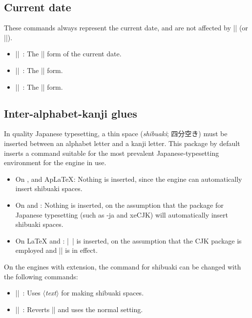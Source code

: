 \documentclass[a4paper]{article}
\newcommand{\Pkg}[1]{\textsf{#1}}
\newcommand{\Meta}[1]{$\langle$\textit{#1}$\rangle$}
\newcommand{\Means}{~:\quad}
\newcommand*{\Ja}[1]{{\fIpaex#1}}
\newcommand*{\+}{\hspace{0.25em minus 0.25em}}
\begin{document}
\subsection{Current date}

These commands always represent the current date,
and are not affected by |\warekisetdate| (or |\warekisettoday|).

\begin{itemize}
\item |\warekitoday|\Means
  The |\warekidate| form of the current date.
\item |\warekikanjitoday|\Means
  The |\warekikanjidate| form.
\item |\warekijkanjitoday|\Means
  The |\warekijkanjidate| form.
\end{itemize}

\subsection{Inter-alphabet-kanji glues}

In quality Japanese typesetting, a thin space
(\emph{shibuaki}; \Ja{四分空き}) must be inserted
between an alphabet letter and a kanji letter.
This package by default inserts a command
suitable for the most prevalent Japanese-typesetting environment
for the engine in use.

\begin{itemize}
\item On {\pLaTeX}, {\upLaTeX} and {Ap\LaTeX}:
  Nothing is inserted,
  since the engine can automatically insert shibuaki spaces.
\item On {\LuaLaTeX} and {\XeLaTeX}:
  Nothing is inserted,
  on the assumption that the package for Japanese typesetting
  (such as \Pkg{\LuaTeX-ja} and \Pkg{xeCJK})
  will automatically insert shibuaki spaces.
\item On {\LaTeX} and {\pdfLaTeX}:
  |~| is inserted,
  on the assumption that the \Pkg{CJK} package is employed
  and |\CJKtilde| is in effect.
\end{itemize}

On the engines with {\eTeX} extension,
the command for shibuaki can be changed with the following commands:
\begin{itemize}
\item |\WarekiUseCustomInterGlue{|\Meta{text}|}|\Means
  Uses \Meta{text} for making shibuaki spaces.
\item |\WarekiUseNormalInterGlue|\Means
  Reverts |\WarekiUseCustomInterGlue|
  and uses the normal setting.
\end{itemize}
\end{document}

